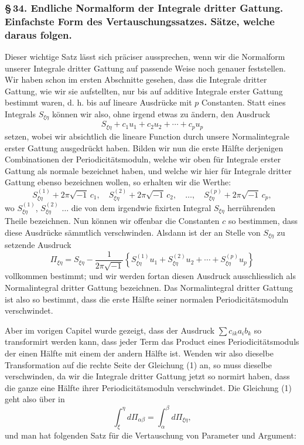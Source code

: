 \documentclass[10pt]{article}
\begin{document}
\subsubsection*{\S\,34. Endliche Normalform der Integrale dritter Gattung. Einfachste Form des Vertauschungssatzes. Sätze, welche daraus folgen.}

Dieser wichtige Satz lässt sich präciser aussprechen, wenn wir die Normalform unserer Integrale dritter Gattung auf passende Weise noch genauer feststellen. Wir haben schon im ersten Abschnitte gesehen, dass die Integrale dritter Gattung, wie wir sie aufstellten, nur bis auf additive Integrale erster Gattung bestimmt waren, d. h. bis auf lineare Ausdrücke mit \(p\) Constanten. Statt eines Integrals \(S_{\xi\eta}\) können wir also, ohne irgend etwas zu ändern, den Ausdruck
\[
S_{\xi\eta}+c_1u_1+c_2u_2+\cdots+c_pu_p
\]
setzen, wobei wir absichtlich die lineare Function durch unsere Normalintegrale erster Gattung ausgedrückt haben. Bilden wir nun die erste Hälfte derjenigen Combinationen der Periodicitätsmoduln, welche wir oben für Integrale erster Gattung als normale bezeichnet haben, und welche wir hier für Integrale dritter Gattung ebenso bezeichnen wollen, so erhalten wir die Werthe:
\[
S_{\xi\eta}^{(1)}+2\pi\sqrt{-1}\,c_1,\quad
S_{\xi\eta}^{(2)}+2\pi\sqrt{-1}\,c_2,\quad\ldots,\quad
S_{\xi\eta}^{(p)}+2\pi\sqrt{-1}\,c_p,
\]
wo \(S_{\xi\eta}^{(1)}\), \(S_{\xi\eta}^{(2)}\) \(\ldots\) die von dem irgendwie fixirten Integral \(S_{\xi\eta}\) herrührenden Theile bezeichnen. Nun können wir offenbar die Constanten \(c\) so bestimmen, dass diese Ausdrücke sämmtlich verschwinden. Alsdann ist der an Stelle von \(S_{\xi\eta}\) zu setzende Ausdruck
\[
\tag{2}
\Pi_{\xi\eta}=S_{\xi\eta}-\frac{1}{2\pi\sqrt{-1}}\left\{S_{\xi\eta}^{(1)}u_1+S_{\xi\eta}^{(2)}u_2+\cdots+S_{\xi\eta}^{(p)}u_p\right\}
\]
vollkommen bestimmt; und wir werden fortan diesen Ausdruck ausschliesslich als Normalintegral dritter Gattung bezeichnen. Das Normalintegral dritter Gattung ist also so bestimmt, dass die erste Hälfte seiner normalen Periodicitätsmoduln verschwindet.

Aber im vorigen Capitel wurde gezeigt, dass der Ausdruck \(\sum c_{ik}a_ib_k\) so transformirt werden kann, dass jeder Term das Product eines Periodicitätsmoduls der einen Hälfte mit einem der andern Hälfte ist. Wenden wir also dieselbe Transformation auf die rechte Seite der Gleichung (1) an, so muss dieselbe verschwinden, da wir die Integrale dritter Gattung jetzt so normirt haben, dass die ganze eine Hälfte ihrer Periodicitätsmoduln verschwindet. Die Gleichung (1) geht also über in
\[
\tag{3}
\int_{\xi}^{\eta}d\Pi_{\alpha\beta}=\int_{\alpha}^{\beta}d\Pi_{\xi\eta},
\]
und man hat folgenden Satz für die Vertauschung von Parameter und Argument:
\end{document}
